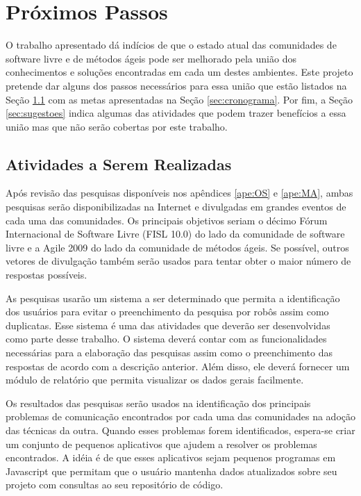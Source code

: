 \chapter{Próximos Passos}
\label{cap:perspectivas}

O trabalho apresentado dá indícios de que o estado atual das
comunidades de software livre e de métodos ágeis pode ser melhorado
pela união dos conhecimentos e soluções encontradas em cada um destes
ambientes. Este projeto pretende dar alguns dos passos necessários
para essa união que estão listados na Seção \ref{sec:atividades} com
as metas apresentadas na Seção \ref{sec:cronograma}. Por fim, a Seção
\ref{sec:sugestoes} indica algumas das atividades que podem trazer
benefícios a essa união mas que não serão cobertas por este trabalho.

\section{Atividades a Serem Realizadas}
\label{sec:atividades}

Após revisão das pesquisas disponíveis nos apêndices \ref{ape:OS} e
\ref{ape:MA}, ambas pesquisas serão disponibilizadas na Internet e
divulgadas em grandes eventos de cada uma das comunidades. Os
principais objetivos seriam o décimo Fórum Internacional de Software
Livre (FISL 10.0) do lado da comunidade de software livre e a Agile
2009 do lado da comunidade de métodos ágeis. Se possível, outros
vetores de divulgação também serão usados para tentar obter o maior
número de respostas possíveis.

As pesquisas usarão um sistema a ser determinado que permita a
identificação dos usuários para evitar o preenchimento da pesquisa por
robôs assim como duplicatas. Esse sistema é uma das atividades que
deverão ser desenvolvidas como parte desse trabalho. O sistema deverá
contar com as funcionalidades necessárias para a elaboração das
pesquisas assim como o preenchimento das respostas de acordo com a
descrição anterior. Além disso, ele deverá fornecer um módulo de
relatório que permita visualizar os dados gerais facilmente.

Os resultados das pesquisas serão usados na identificação dos
principais problemas de comunicação encontrados por cada uma das
comunidades na adoção das técnicas da outra. Quando esses problemas
forem identificados, espera-se criar um conjunto de pequenos
aplicativos que ajudem a resolver os problemas encontrados. A idéia é
de que esses aplicativos sejam pequenos programas em Javascript que
permitam que o usuário mantenha dados atualizados sobre seu projeto
com consultas ao seu repositório de código.

